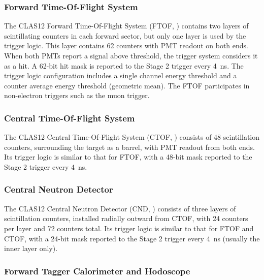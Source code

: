 \subsubsection{Forward Time-Of-Flight System}

The CLAS12 Forward Time-Of-Flight System (FTOF, \cite{ftof-ref}) contains two layers of scintillating counters in each forward sector, but only one layer is used by the trigger logic. This layer contains 62 counters with PMT readout on both ends. When both PMTs report a signal above threshold, the trigger system considers it as a hit. A 62-bit hit mask is reported to the Stage 2 trigger every 4~ns. The trigger logic configuration includes a single channel energy threshold and a counter average energy threshold (geometric mean). The FTOF participates in non-electron triggers such as the muon trigger.


\subsubsection{Central Time-Of-Flight System}

The CLAS12 Central Time-Of-Flight System (CTOF, \cite{ctof-ref}) consists of 48 scintillation counters, surrounding the target as a barrel, with PMT readout from both ends. Its trigger logic is similar to that for FTOF, with a 48-bit mask reported to the Stage 2 trigger every 4~ns.


\subsubsection{Central Neutron Detector}

The CLAS12 Central Neutron Detector (CND, \cite{cnd-ref}) consists of three layers of scintillation counters, installed radially outward from CTOF, with 24 counters per layer and 72 counters total. Its trigger logic is similar to that for FTOF and CTOF, with a 24-bit mask reported to the Stage 2 trigger every 4~ns (usually the inner layer only).


\subsubsection{Forward Tagger Calorimeter and Hodoscope}

